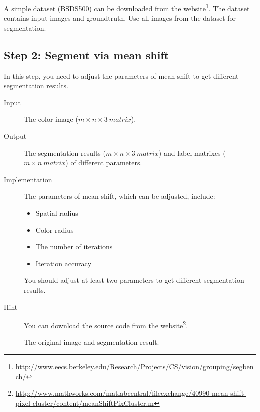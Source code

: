 \documentclass[12pt]{article}
\begin{document}
A simple dataset (BSDS500) can be downloaded from the website\footnote{\url{http://www.eecs.berkeley.edu/Research/Projects/CS/vision/grouping/segbench/}}. The dataset contains input images and groundtruth. Use all images from the dataset for segmentation.

\subsection{Step 2: Segment via mean shift}\label{step:2}
In this step, you need to adjust the parameters of mean shift to get different segmentation results.
\begin{description}
\item[Input] The color image ($m \times n \times 3~matrix$).
\item[Output] The segmentation results ($m \times n \times 3~matrix$) and label matrixes ($m \times n~matrix$) of different parameters.
\item[Implementation] The parameters of mean shift, which can be adjusted, include:
\begin{itemize}
\item Spatial radius
\item Color radius
\item The number of iterations
\item Iteration accuracy
\end{itemize}
You should adjust at least two parameters to get different segmentation results.
\item[Hint] You can download the source code from the website\footnote{\url{http://www.mathworks.com/matlabcentral/fileexchange/40990-mean-shift-pixel-cluster/content/meanShiftPixCluster.m}}.
\end{description}
\begin{figure}[!ht]
  \centering 
  \caption{The original image and segmentation result.}
  \label{fig: } %
\end{figure}
\end{document}
